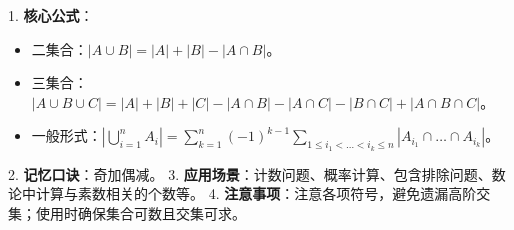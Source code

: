 \begin{summarybox}
1. \textbf{核心公式}：
   \begin{itemize}
       \item 二集合：$|A \cup B| = |A| + |B| - |A \cap B|$。
       \item 三集合：$|A \cup B \cup C| = |A| + |B| + |C| - |A \cap B| - |A \cap C| - |B \cap C| + |A \cap B \cap C|$。
       \item 一般形式：$|\bigcup_{i=1}^n A_i| = \sum_{k=1}^n (-1)^{k-1} \sum_{1\le i_1 < \dots < i_k \le n} |A_{i_1} \cap \dots \cap A_{i_k}|$。
   \end{itemize}
2. \textbf{记忆口诀}：奇加偶减。
3. \textbf{应用场景}：计数问题、概率计算、包含排除问题、数论中计算与素数相关的个数等。
4. \textbf{注意事项}：注意各项符号，避免遗漏高阶交集；使用时确保集合可数且交集可求。
\end{summarybox}